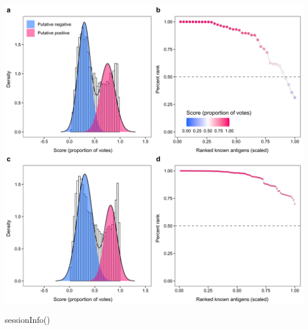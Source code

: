 \documentclass[
  11pt,
  oneside]{book}
\newenvironment{Shaded}{\begin{snugshade}}{\end{snugshade}}
\newcommand{\FunctionTok}[1]{\textcolor[rgb]{0.00,0.00,0.00}{#1}}
\newcommand{\NormalTok}[1]{#1}
\begin{document}
\begin{center}\includegraphics[width=1\linewidth]{./figures/Fig 1} \end{center}

\begin{Shaded}
\begin{Highlighting}[]
\FunctionTok{sessionInfo}\NormalTok{()}
\end{Highlighting}
\end{Shaded}
\end{document}
